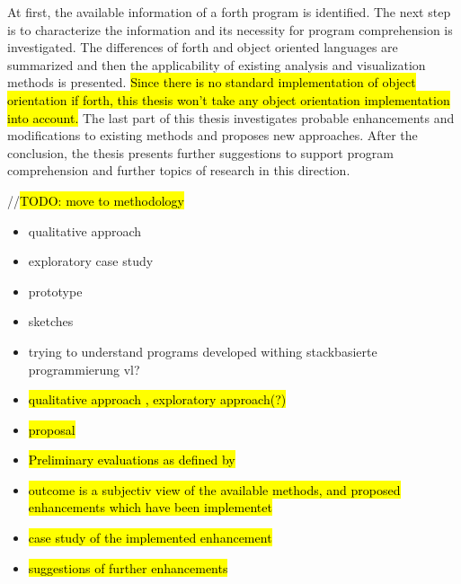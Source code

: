 At first, the available information of a forth program is identified. The next step is to characterize the information and its necessity for program comprehension is investigated. The differences of forth and object oriented languages are summarized and then the applicability of existing analysis and visualization methods is presented. \hl{Since there is no standard implementation of object orientation if forth, this thesis won't take any object orientation implementation into account.}
The last part of this thesis investigates probable enhancements and modifications to existing methods and proposes new approaches.
After the conclusion, the thesis presents further suggestions to support program comprehension and further topics of research in this direction.

//\hl{TODO: move to methodology}
\begin{itemize}
\item qualitative approach
\item exploratory case study
\item prototype
\item sketches
\item trying to understand programs developed withing stackbasierte programmierung vl?

\item \hl{qualitative approach , exploratory approach(?)}
\item \hl{proposal}
\item \hl{Preliminary evaluations as defined by} \cite{Cornelissen:2009:SSP:1638616.1639301}
\item \hl{outcome is a subjectiv view of the available methods, and proposed enhancements which have been implementet}
\item \hl{case study of the implemented enhancement}
\item \hl{suggestions of further enhancements}
\end{itemize}

